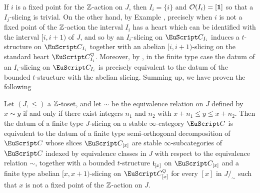 If $i$ is a fixed point for the $\mathbb{Z}$-action on $J$, then $I_i=\{i\}$ and $\mathcal{O}(I_i)=[\mathbf{1}]$ so that a $I_j$-slicing is trivial. On the other hand, by Example , precisely when $i$ is not a fixed point of the $\mathbb{Z}$-action the interval $I_i$ has a heart which can be identified with the interval $[i,i+1)$ of $J$, and so by \aprop{} an $I_i$-slicing on $\C_{I_i}$ induces a $t$-structure on $\C_{I_i}$ together with an abelian $[i,i+1)$-slicing on the standard heart $\C_{I_i}^\heart$. Moreover, by \aprop{}, in the finite type case the datum of an $I_i$-slicing on $\C_{I_i}$ is precisely equivalent to the datum of the bounded $t$-structure with the abelian slicing. Summing up, we have proven the following
\begin{theorem}\label{conclusion}
Let $(J,\leq)$ a $\mathbb{Z}$-toset, and let $\sim$ be the equivalence relation on $J$ defined by $x\sim y$ if and only if there exist integers $n_1$ and $n_2$ with $x+n_1\leq y\leq x+n_2$. Then the datum of a finite type $J$-slicing on a stable $\infty$-category $\C$ is equivalent to the datum of a finite type semi-orthogonal decomposition of $\C$ whose slices $\C_{[x]}$ are stable  $\infty$-subcategories of $\C$ indexed by equivalence classes in $J$ with respect to the equivalence relation $\sim$, together with a bounded $t$-structure $\mathfrak{t}_{[x]}$ on $\C_{[x]}$ and a finite type abelian $[x,x+1)$-slicing on $\C_{[x]}^\heart$ for every $[x]$ in $J/_{\!\sim}$ such that $x$ is not a fixed point of the $\mathbb{Z}$-action on $J$.
\end{theorem}





